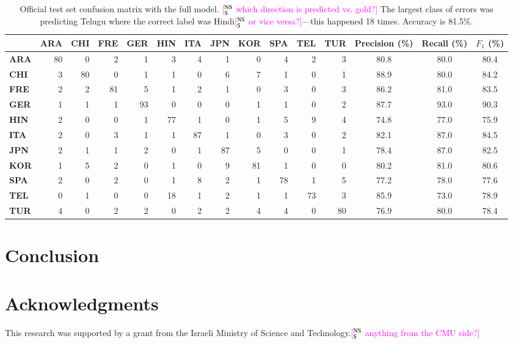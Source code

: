 \documentclass[11pt,letterpaper]{article}
\newcommand{\ensuretext}[1]{#1}
\newcommand{\nssmarker}{\ensuretext{\textcolor{magenta}{\ensuremath{^{\textsc{NS}}_{\textsc{S}}}}}}
\newcommand{\arkcomment}[3]{\ensuretext{\textcolor{#3}{[#1 #2]}}}
\newcommand{\nss}[1]{\arkcomment{\nssmarker}{#1}{magenta}}
\begin{document}
\begin{table*}\small\centering
\begin{tabular}{>{\bf}l|r@{ }r@{ }r@{ }r@{ }r@{ }r@{ }r@{ }r@{ }r@{ }r@{ }r|ccc} %
	& \bf ARA & \bf CHI & \bf FRE & \bf GER & \bf HIN & \bf ITA & \bf JPN & \bf KOR & \bf SPA & \bf TEL & \bf TUR & \bf Precision (\%) & \bf Recall (\%) & \bf $F_1$ (\%) \\
\hline
ARA & 80 & 0 & 2 & 1 & 3 & 4 & 1 & 0 & 4 & 2 & 3 & 80.8 & 80.0 & 80.4 \\
CHI & 3 & 80 & 0 & 1 & 1 & 0 & 6 & 7 & 1 & 0 & 1 & 88.9 & 80.0 & 84.2 \\
FRE & 2 & 2 & 81 & 5 & 1 & 2 & 1 & 0 & 3 & 0 & 3 & 86.2 & 81.0 & 83.5 \\
\hline
GER & 1 & 1 & 1 & 93 & 0 & 0 & 0 & 1 & 1 & 0 & 2 & 87.7 & 93.0 & 90.3 \\
HIN & 2 & 0 & 0 & 1 & 77 & 1 & 0 & 1 & 5 & 9 & 4 & 74.8 & 77.0 & 75.9 \\
ITA & 2 & 0 & 3 & 1 & 1 & 87 & 1 & 0 & 3 & 0 & 2 & 82.1 & 87.0 & 84.5 \\
\hline
JPN & 2 & 1 & 1 & 2 & 0 & 1 & 87 & 5 & 0 & 0 & 1 & 78.4 & 87.0 & 82.5 \\
KOR & 1 & 5 & 2 & 0 & 1 & 0 & 9 & 81 & 1 & 0 & 0 & 80.2 & 81.0 & 80.6 \\
SPA & 2 & 0 & 2 & 0 & 1 & 8 & 2 & 1 & 78 & 1 & 5 & 77.2 & 78.0 & 77.6 \\
\hline
TEL & 0 & 1 & 0 & 0 & 18 & 1 & 2 & 1 & 1 & 73 & 3 & 85.9 & 73.0 & 78.9 \\
TUR & 4 & 0 & 2 & 2 & 0 & 2 & 2 & 4 & 4 & 0 & 80 & 76.9 & 80.0 & 78.4 \\
\end{tabular}
\caption{Official test set confusion matrix with the full model. \nss{which direction is predicted vs. gold?}
The largest class of errors was predicting Telugu where the correct label was Hindi\nss{or vice versa?}---this happened 18 times. 
Accuracy is 81.5\%.}\label{tbl:matrix}
\end{table*}


\section{Conclusion}
\label{sec:conclusion}

\section*{Acknowledgments}
This research was supported by a grant from the Israeli Ministry of
Science and Technology.\nss{anything from the CMU side?}

\clearpage



\end{document}
